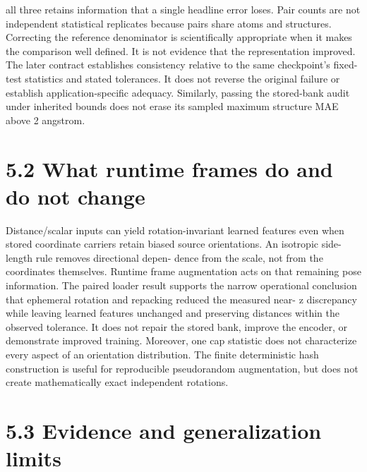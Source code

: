 \documentclass[11pt]{article}
\begin{document}
all three retains information that a single headline error loses. Pair counts are not independent
statistical replicates because pairs share atoms and structures.
Correcting the reference denominator is scientifically appropriate when it makes the comparison
well defined. It is not evidence that the representation improved. The later contract establishes
consistency relative to the same checkpoint’s fixed-test statistics and stated tolerances. It does
not reverse the original failure or establish application-specific adequacy. Similarly, passing the
stored-bank audit under inherited bounds does not erase its sampled maximum structure MAE
above 2 angstrom.

\section*{5.2 What runtime frames do and do not change}

Distance/scalar inputs can yield rotation-invariant learned features even when stored coordinate
carriers retain biased source orientations. An isotropic side-length rule removes directional depen-
dence from the scale, not from the coordinates themselves. Runtime frame augmentation acts on
that remaining pose information.
The paired loader result supports the narrow operational conclusion that ephemeral rotation and
repacking reduced the measured near- z discrepancy while leaving learned features unchanged and
preserving distances within the observed tolerance. It does not repair the stored bank, improve
the encoder, or demonstrate improved training. Moreover, one cap statistic does not characterize
every aspect of an orientation distribution. The finite deterministic hash construction is useful for
reproducible pseudorandom augmentation, but does not create mathematically exact independent
rotations.

\section*{5.3 Evidence and generalization limits}
\end{document}
